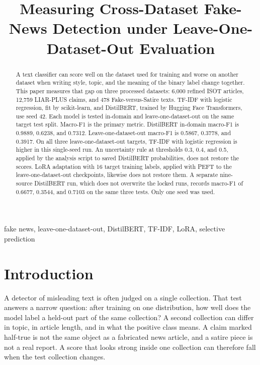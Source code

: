 \documentclass[conference,letterpaper]{IEEEtran}
\begin{document}
\title{Measuring Cross-Dataset Fake-News Detection under Leave-One-Dataset-Out Evaluation}

\author{
}

\maketitle

\begin{abstract}
A text classifier can score well on the dataset used for training and worse on another dataset when writing style, topic, and the meaning of the binary label change together. This paper measures that gap on three processed datasets: 6,000 refined ISOT articles, 12,759 LIAR-PLUS claims, and 478 Fake-versus-Satire texts. TF-IDF with logistic regression, fit by scikit-learn, and DistilBERT, trained by Hugging Face Transformers, use seed 42. Each model is tested in-domain and leave-one-dataset-out on the same target test split. Macro-F1 is the primary metric. DistilBERT in-domain macro-F1 is 0.9889, 0.6238, and 0.7312. Leave-one-dataset-out macro-F1 is 0.5867, 0.3778, and 0.3917. On all three leave-one-dataset-out targets, TF-IDF with logistic regression is higher in this single-seed run. An uncertainty rule at thresholds 0.3, 0.4, and 0.5, applied by the analysis script to saved DistilBERT probabilities, does not restore the scores. LoRA adaptation with 16 target training labels, applied with PEFT to the leave-one-dataset-out checkpoints, likewise does not restore them. A separate nine-source DistilBERT run, which does not overwrite the locked runs, records macro-F1 of 0.6677, 0.3544, and 0.7103 on the same three tests. Only one seed was used.
\end{abstract}

\begin{IEEEkeywords}
fake news, leave-one-dataset-out, DistilBERT, TF-IDF, LoRA, selective prediction
\end{IEEEkeywords}

\section{Introduction}
A detector of misleading text is often judged on a single collection. That test answers a narrow question: after training on one distribution, how well does the model label a held-out part of the same collection? A second collection can differ in topic, in article length, and in what the positive class means. A claim marked half-true is not the same object as a fabricated news article, and a satire piece is not a real report. A score that looks strong inside one collection can therefore fall when the test collection changes.
\end{document}
